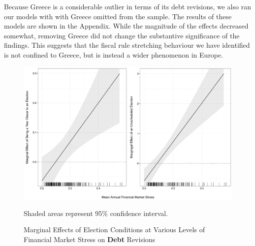 \documentclass[]{article}
\begin{document}
Because Greece is a considerable outlier in terms of its debt revisions, we also ran our models with with Greece omitted from the sample. The results of these models are shown in the Appendix. While the magnitude of the effects decreased somewhat, removing Greece did not change the substantive significance of the findings. This suggests that the fiscal rule stretching behaviour we have identified is not confined to Greece, but is instead a wider phenomenon in Europe.


\begin{figure}
    \caption{Marginal Effects of Election Conditions at Various Levels of Financial Market Stress on \textbf{Debt} Revisions}
    \label{me_finstress_elect}

    \begin{center}
        \includegraphics[scale=0.45]{figures/fsi_elect_me.pdf}
    \end{center}

	{\scriptsize{Shaded areas represent 95\% confidence interval.}}

\end{figure}
\end{document}
